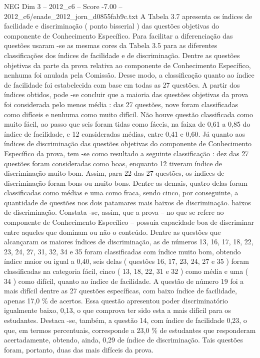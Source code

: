 \begin{textsample}{NEG Dim 3 – 2012\_c6 – Score -7.00 – 2012\_c6/enade\_2012\_jorn\_d0855fab9c.txt}
A Tabela 3.7 apresenta os índices de facilidade e discriminação ( ponto bisserial ) das questões objetivas do componente de Conhecimento Específico.
Para facilitar a diferenciação das questões usaram -se as mesmas cores da Tabela 3.5 para as diferentes classificações dos índices de facilidade e de discriminação.
Dentre as questões objetivas da parte da prova relativa ao componente de Conhecimento Específico, nenhuma foi anulada pela Comissão.
Desse modo, a classificação quanto ao índice de facilidade foi estabelecida com base em todas as 27 questões.
A partir dos índices obtidos, pode -se concluir que a maioria das questões objetivas da prova foi considerada pelo menos média : das 27 questões, nove foram classificadas como difíceis e nenhuma como muito difícil.
Não houve questão classificada como muito fácil, ao passo que seis foram tidas como fáceis, na faixa de 0,61 a 0,85 do índice de facilidade, e 12 consideradas médias, entre 0,41 e 0,60.
Já quanto aos índices de discriminação das questões objetivas do componente de Conhecimento Específico da prova, tem -se como resultado a seguinte classificação : dez das 27 questões foram consideradas como boas, enquanto 12 tiveram índice de discriminação muito bom.
Assim, para 22 das 27 questões, os índices de discriminação foram bons ou muito bons.
Dentre as demais, quatro delas foram classificadas como médias e uma como fraca, sendo cinco, por conseguinte, a quantidade de questões nos dois patamares mais baixos de discriminação. baixos de discriminação.
Constata -se, assim, que a prova – no que se refere ao componente de Conhecimento Específico – possuía capacidade boa de discriminar entre aqueles que dominam ou não o conteúdo.
Dentre as questões que alcançaram os maiores índices de discriminação, as de números 13, 16, 17, 18, 22, 23, 24, 27, 31, 32, 34 e 35 foram classificadas com índice muito bom, obtendo índice maior ou igual a 0,40, seis delas ( questões 16, 17, 23, 24, 27 e 35 ) foram classificadas na categoria fácil, cinco ( 13, 18, 22, 31 e 32 ) como média e uma ( 34 ) como difícil, quanto ao índice de facilidade.
A questão de número 19 foi a mais difícil dentre as 27 questões específicas, com baixo índice de facilidade, apenas 17,0 \% de acertos.
Essa questão apresentou poder discriminatório igualmente baixo, 0,13, o que comprova ter sido esta a mais difícil para os estudantes.
Destaca -se, também, a questão 14, com índice de facilidade 0,23, o que, em termos percentuais, corresponde a 23,0 \% de estudantes que responderam acertadamente, obtendo, ainda, 0,29 de índice de discriminação.
Tais questões foram, portanto, duas das mais difíceis da prova.

\end{textsample}
